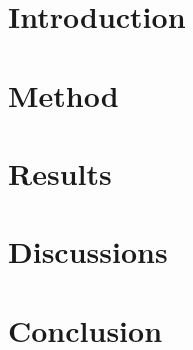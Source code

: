 \documentclass[letterpaper,11.8pt, twocolumn]{article}
\begin{document}
\section{Introduction}\label{s:in}
    
    
\section{Method}\label{s:sc}
    

\section{Results}\label{s:rs}
    

\section{Discussions}\label{s:ds}
    
       
\section{Conclusion}\label{s:co}
    

\balance
\listoffigures
\printbibliography
\end{document}
